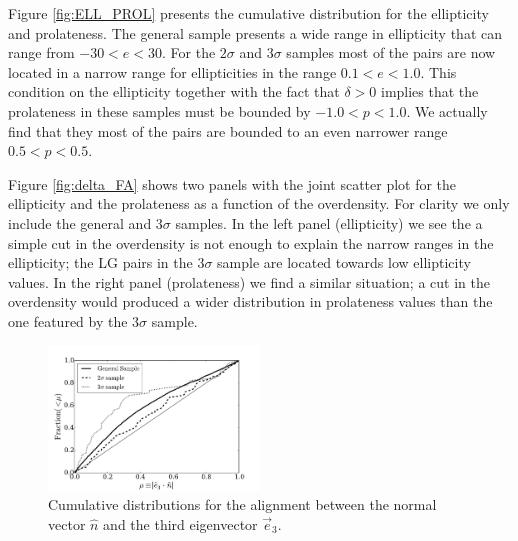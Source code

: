 \documentclass{emulateapj}
\begin{document}
Figure \ref{fig:ELL_PROL} presents the cumulative distribution for
the ellipticity and prolateness. The general sample presents a wide
range in ellipticity that can range from $-30<e<30$. For the $2\sigma$
and $3\sigma$ samples most of the pairs are now located in a narrow
range for ellipticities in the range $0.1<e<1.0$. This condition on
the ellipticity together with the fact that $\delta>0$ implies that
the prolateness in these samples must be bounded by
$-1.0<p<1.0$. We actually find that they most of the pairs are bounded
to an even narrower range $0.5<p<0.5$. 

Figure \ref{fig:delta_FA} shows two panels with the joint scatter plot
for the ellipticity and the prolateness as a function of the
overdensity. For clarity we only include the general and $3\sigma$
samples. In the left panel (ellipticity) we see the a simple cut in
the overdensity is not enough to explain the narrow ranges in the
ellipticity; the LG pairs in the $3\sigma$ sample are located towards
low ellipticity values. In the right panel (prolateness) we find a
similar situation; a cut in the overdensity would produced a wider
distribution in prolateness values than the one featured by the
$3\sigma$ sample.


\begin{figure}
\begin{center}
  \includegraphics[width=0.50\textwidth]{alignments_e3.pdf} 
\end{center}
\caption{Cumulative distributions for the alignment between the normal
  vector $\hat{n}$ and the third eigenvector $\vec{e}_3$.
    \label{fig:alignment}}  
\end{figure}

\end{document}
